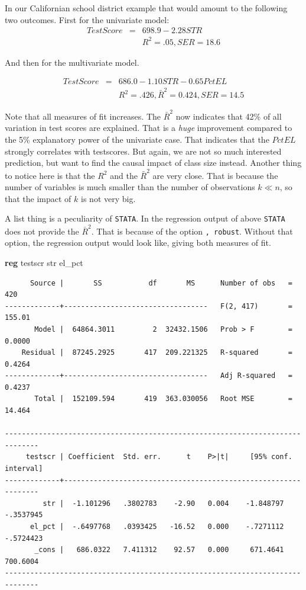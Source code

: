 \documentclass[
]{book}
\newenvironment{Shaded}{\begin{snugshade}}{\end{snugshade}}
\newcommand{\KeywordTok}[1]{\textcolor[rgb]{0.13,0.29,0.53}{\textbf{#1}}}
\newcommand{\NormalTok}[1]{#1}
\begin{document}
In our Californian school district example that would amount to the following two outcomes. First for the univariate model:
\begin{eqnarray}
TestScore &= &698.9- 2.28  STR \\
&&R^2 = .05, SER = 18.6
\end{eqnarray}

And then for the multivariate model.

\begin{eqnarray}
TestScore &=& 686.0 - 1.10  STR - 0.65 PctEL \\
&&R^2=.426, \bar{R}^2=0.424, SER = 14.5
\end{eqnarray}

Note that all measures of fit increases. The \(\bar{R}^2\) now indicates that 42\% of all variation in test scores are explained. That is a \emph{huge} improvement compared to the 5\% explanatory power of the univariate case. That indicates that the \(PctEL\) strongly correlates with testscores. But again, we are not so much interested prediction, but want to find the causal impact of class size instead. Another thing to notice here is that the \(R^2\) and the \(\bar{R}^2\) are very close. That is because the number of variables is much smaller than the number of observations \(k \ll n\), so that the impact of \(k\) is not very big.

A list thing is a peculiarity of \texttt{STATA}. In the regression output of above \texttt{STATA} does not provide the \(\bar{R}^2\). That is because of the option \texttt{,\ robust}. Without that option, the regression output would look like, giving both measures of fit.

\begin{Shaded}
\begin{Highlighting}[]
\KeywordTok{reg}\NormalTok{ testscr str el\_pct}
\end{Highlighting}
\end{Shaded}

\begin{verbatim}
      Source |       SS           df       MS      Number of obs   =       420
-------------+----------------------------------   F(2, 417)       =    155.01
       Model |  64864.3011         2  32432.1506   Prob > F        =    0.0000
    Residual |  87245.2925       417  209.221325   R-squared       =    0.4264
-------------+----------------------------------   Adj R-squared   =    0.4237
       Total |  152109.594       419  363.030056   Root MSE        =    14.464

------------------------------------------------------------------------------
     testscr | Coefficient  Std. err.      t    P>|t|     [95% conf. interval]
-------------+----------------------------------------------------------------
         str |  -1.101296   .3802783    -2.90   0.004    -1.848797   -.3537945
      el_pct |  -.6497768   .0393425   -16.52   0.000    -.7271112   -.5724423
       _cons |   686.0322   7.411312    92.57   0.000     671.4641    700.6004
------------------------------------------------------------------------------
\end{verbatim}
\end{document}
